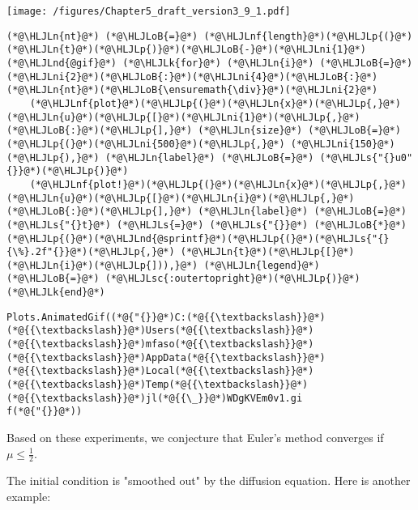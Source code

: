 \documentclass[12pt,landscape]{article}
\newcommand{\HLJLk}[1]{\textcolor[RGB]{148,91,176}{\textbf{#1}}}
\newcommand{\HLJLn}[1]{#1}
\newcommand{\HLJLnd}[1]{\textcolor[RGB]{214,102,97}{#1}}
\newcommand{\HLJLnf}[1]{\textcolor[RGB]{66,102,213}{#1}}
\newcommand{\HLJLs}[1]{\textcolor[RGB]{201,61,57}{#1}}
\newcommand{\HLJLsc}[1]{\textcolor[RGB]{201,61,57}{#1}}
\newcommand{\HLJLni}[1]{\textcolor[RGB]{59,151,46}{#1}}
\newcommand{\HLJLoB}[1]{\textcolor[RGB]{102,102,102}{\textbf{#1}}}
\newcommand{\HLJLp}[1]{#1}
\begin{document}
{\texttt{[image: /figures/Chapter5\_draft\_version3\_9\_1.pdf]}

\begin{lstlisting}
(*@\HLJLn{nt}@*) (*@\HLJLoB{=}@*) (*@\HLJLnf{length}@*)(*@\HLJLp{(}@*)(*@\HLJLn{t}@*)(*@\HLJLp{)}@*)(*@\HLJLoB{-}@*)(*@\HLJLni{1}@*)
(*@\HLJLnd{@gif}@*) (*@\HLJLk{for}@*) (*@\HLJLn{i}@*) (*@\HLJLoB{=}@*) (*@\HLJLni{2}@*)(*@\HLJLoB{:}@*)(*@\HLJLni{4}@*)(*@\HLJLoB{:}@*)(*@\HLJLn{nt}@*)(*@\HLJLoB{\ensuremath{\div}}@*)(*@\HLJLni{2}@*) 
    (*@\HLJLnf{plot}@*)(*@\HLJLp{(}@*)(*@\HLJLn{x}@*)(*@\HLJLp{,}@*) (*@\HLJLn{u}@*)(*@\HLJLp{[}@*)(*@\HLJLni{1}@*)(*@\HLJLp{,}@*)(*@\HLJLoB{:}@*)(*@\HLJLp{],}@*) (*@\HLJLn{size}@*) (*@\HLJLoB{=}@*) (*@\HLJLp{(}@*)(*@\HLJLni{500}@*)(*@\HLJLp{,}@*) (*@\HLJLni{150}@*)(*@\HLJLp{),}@*) (*@\HLJLn{label}@*) (*@\HLJLoB{=}@*) (*@\HLJLs{"{}u0"{}}@*)(*@\HLJLp{)}@*)
    (*@\HLJLnf{plot!}@*)(*@\HLJLp{(}@*)(*@\HLJLn{x}@*)(*@\HLJLp{,}@*) (*@\HLJLn{u}@*)(*@\HLJLp{[}@*)(*@\HLJLn{i}@*)(*@\HLJLp{,}@*)(*@\HLJLoB{:}@*)(*@\HLJLp{],}@*) (*@\HLJLn{label}@*) (*@\HLJLoB{=}@*) (*@\HLJLs{"{}t}@*) (*@\HLJLs{=}@*) (*@\HLJLs{"{}}@*) (*@\HLJLoB{*}@*) (*@\HLJLp{(}@*)(*@\HLJLnd{@sprintf}@*)(*@\HLJLp{(}@*)(*@\HLJLs{"{}{\%}.2f"{}}@*)(*@\HLJLp{,}@*) (*@\HLJLn{t}@*)(*@\HLJLp{[}@*)(*@\HLJLn{i}@*)(*@\HLJLp{])),}@*) (*@\HLJLn{legend}@*) (*@\HLJLoB{=}@*) (*@\HLJLsc{:outertopright}@*)(*@\HLJLp{)}@*)
(*@\HLJLk{end}@*)
\end{lstlisting}

\begin{lstlisting}
Plots.AnimatedGif((*@{"{}}@*)C:(*@{{\textbackslash}}@*)(*@{{\textbackslash}}@*)Users(*@{{\textbackslash}}@*)(*@{{\textbackslash}}@*)mfaso(*@{{\textbackslash}}@*)(*@{{\textbackslash}}@*)AppData(*@{{\textbackslash}}@*)(*@{{\textbackslash}}@*)Local(*@{{\textbackslash}}@*)(*@{{\textbackslash}}@*)Temp(*@{{\textbackslash}}@*)(*@{{\textbackslash}}@*)jl(*@{{\_}}@*)WDgKVEm0v1.gi
f(*@{"{}}@*))
\end{lstlisting}


Based on these experiments, we conjecture that Euler's method converges if $\mu \leq \frac{1}{2}$.

The initial condition is "smoothed out" by the diffusion equation.  Here is another example:


}
\end{document}

